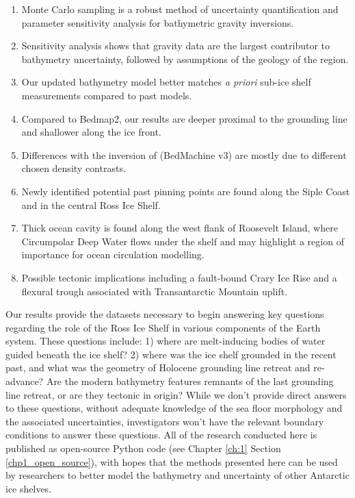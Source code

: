 \begin{enumerate}
    \item Monte Carlo sampling is a robust method of uncertainty quantification and parameter sensitivity analysis for bathymetric gravity inversions.
    \item Sensitivity analysis shows that gravity data are the largest contributor to bathymetry uncertainty, followed by assumptions of the geology of the region.
    \item Our updated bathymetry model better matches \textit{a priori} sub-ice shelf measurements compared to past models.
    \item Compared to Bedmap2, our results are deeper proximal to the grounding line and shallower along the ice front.
    \item Differences with the inversion of \citet{tintoross2019} (BedMachine v3) are mostly due to different chosen density contrasts.
    \item Newly identified potential past pinning points are found along the Siple Coast and in the central Ross Ice Shelf.
    \item Thick ocean cavity is found along the west flank of Roosevelt Island, where Circumpolar Deep Water flows under the shelf and may highlight a region of importance for ocean circulation modelling. 
    \item Possible tectonic implications including a fault-bound Crary Ice Rise and a flexural trough associated with Transantarctic Mountain uplift.
\end{enumerate}

Our results provide the datasets necessary to begin answering key questions regarding the role of the Ross Ice Shelf in various components of the Earth system. These questions include: 1) where are melt-inducing bodies of water guided beneath the ice shelf? 2) where was the ice shelf grounded in the recent past, and what was the geometry of Holocene grounding line retreat and re-advance? Are the modern bathymetry features remnants of the last grounding line retreat, or are they tectonic in origin? While we don't provide direct answers to these questions, without adequate knowledge of the sea floor morphology and the associated uncertainties, investigators won't have the relevant boundary conditions to answer these questions. All of the research conducted here is published as open-source Python code (see Chapter \ref{ch:1} Section \ref{chp1_open_source}), with hopes that the methods presented here can be used by researchers to better model the bathymetry and uncertainty of other Antarctic ice shelves. 